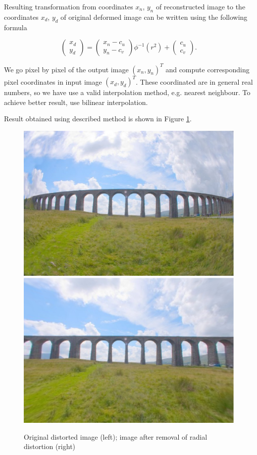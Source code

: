 \documentclass[12pt,titlepage]{article}
\begin{document}
Resulting transformation from coordinates $x_n$, $y_n$ of reconstructed image to the coordinates $x_d$, $y_d$ of original deformed image can be written using the following formula

\begin{equation}
	\label{rld:trans}
    \left( \begin{array}{c}
    x_d \\
    y_d \end{array} \right)
    =
    \left( \begin{array}{c}
    x_n - c_u \\
    y_n - c_v \end{array}\right)
    \phi^{-1}(r^2)
    +
    \left( \begin{array}{c}
    c_u \\
    c_v \end{array}\right).
\end{equation}


We go pixel by pixel of the output image $(x_n, y_n)^T$ and compute corresponding pixel coordinates in input image $(x_d, y_d)^T$. These coordinated are in general real numbers, so we have use a valid interpolation method, e.g. nearest neighbour. To achieve better result, use bilinear interpolation.


Result obtained using described method is shown in Figure \ref{rld:odstaneni_zkresleni}.

\begin{figure}
	\begin{center}
		\includegraphics[scale=0.53]{distorted_image.eps}
		\includegraphics[scale=0.53]{human_adjusted_image.eps}
		\caption{Original distorted image (left); image after removal of radial distortion (right)}
		\label{rld:odstaneni_zkresleni}
	\end{center}
\end{figure}
\end{document}
